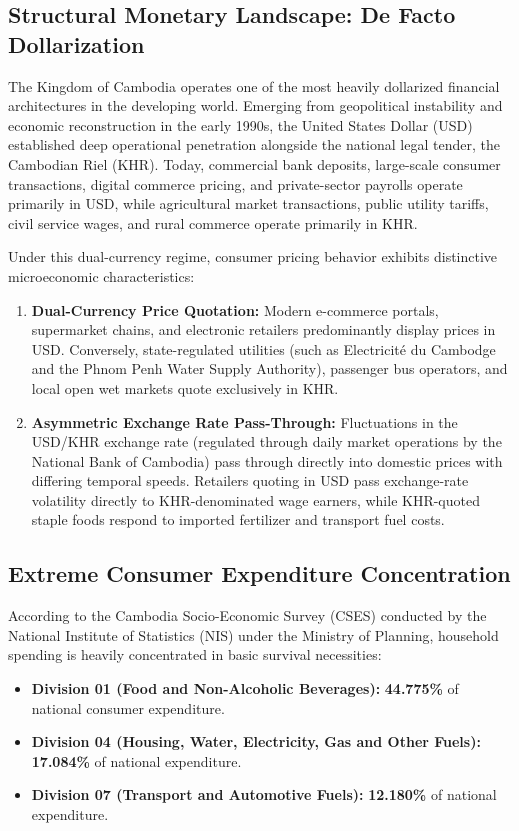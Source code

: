 \documentclass[11pt,a4paper,oneside]{article}
\begin{document}
\subsection{Structural Monetary Landscape: De Facto Dollarization}
The Kingdom of Cambodia operates one of the most heavily dollarized financial architectures in the developing world. Emerging from geopolitical instability and economic reconstruction in the early 1990s, the United States Dollar (USD) established deep operational penetration alongside the national legal tender, the Cambodian Riel (KHR). Today, commercial bank deposits, large-scale consumer transactions, digital commerce pricing, and private-sector payrolls operate primarily in USD, while agricultural market transactions, public utility tariffs, civil service wages, and rural commerce operate primarily in KHR.

Under this dual-currency regime, consumer pricing behavior exhibits distinctive microeconomic characteristics:
\begin{enumerate}
    \item \textbf{Dual-Currency Price Quotation:} Modern e-commerce portals, supermarket chains, and electronic retailers predominantly display prices in USD. Conversely, state-regulated utilities (such as Electricité du Cambodge and the Phnom Penh Water Supply Authority), passenger bus operators, and local open wet markets quote exclusively in KHR.
    \item \textbf{Asymmetric Exchange Rate Pass-Through:} Fluctuations in the USD/KHR exchange rate (regulated through daily market operations by the National Bank of Cambodia) pass through directly into domestic prices with differing temporal speeds. Retailers quoting in USD pass exchange-rate volatility directly to KHR-denominated wage earners, while KHR-quoted staple foods respond to imported fertilizer and transport fuel costs.
\end{enumerate}

\subsection{Extreme Consumer Expenditure Concentration}
According to the Cambodia Socio-Economic Survey (CSES) conducted by the National Institute of Statistics (NIS) under the Ministry of Planning, household spending is heavily concentrated in basic survival necessities:
\begin{itemize}[noitemsep]
    \item \textbf{Division 01 (Food and Non-Alcoholic Beverages):} \textbf{44.775\%} of national consumer expenditure.
    \item \textbf{Division 04 (Housing, Water, Electricity, Gas and Other Fuels):} \textbf{17.084\%} of national expenditure.
    \item \textbf{Division 07 (Transport and Automotive Fuels):} \textbf{12.180\%} of national expenditure.
\end{itemize}
\end{document}
